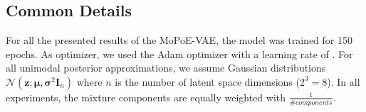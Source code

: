 \subsection{Common Details}
For all the presented results of the MoPoE-VAE, the model was trained for 150 epochs.
As optimizer, we used the Adam optimizer \cite{adam} with a learning rate of \learningrate.
For all unimodal posterior approximations, we assume Gaussian distributions $\mathcal{N}(\textbf{z}; \bm{\mu}, \bm{\sigma}^2\textbf{I}_n)$ where $n$ is the number of latent space dimensions ($2^3 = 8$). In all experiments, the mixture components are equally weighted with $\frac{1}{\#components}$.

